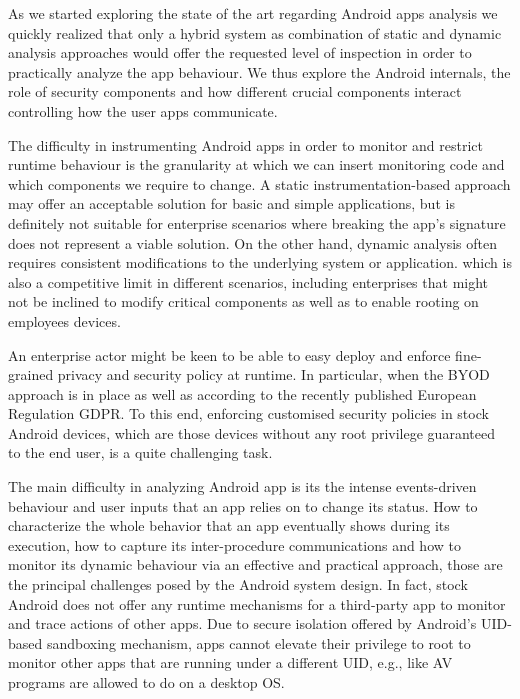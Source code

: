 As we started exploring the state of the art regarding Android apps  analysis we quickly realized that only a hybrid system as combination of static and dynamic analysis approaches would  offer the requested level of inspection in order to practically analyze the app behaviour.  We thus explore the Android internals, the role of security components and how different crucial components interact controlling how the user apps communicate.

The difficulty in instrumenting Android apps in order to monitor and restrict runtime behaviour is the granularity at which we can insert monitoring code and which components we require to change. A static instrumentation-based approach may offer an acceptable solution for basic and simple applications, but is definitely not suitable for enterprise scenarios where breaking the app's signature does not represent a viable solution. On the other hand, dynamic analysis often requires consistent modifications to the underlying system or application. which is also a competitive limit in different scenarios, including enterprises that might not be inclined to modify critical components as well as to enable rooting on employees devices.

An enterprise actor might be keen to be able to easy deploy and enforce fine-grained privacy and security policy at runtime. In particular, when the BYOD approach is in place as well as according to the recently published European Regulation GDPR. To this end, enforcing customised security policies in stock Android devices, which are those devices without any root privilege guaranteed to the end user, is a quite challenging task. 

The main difficulty in analyzing Android app is its the intense events-driven behaviour and user inputs that an app relies on to change its status. How to characterize the whole behavior that an app eventually shows during its execution, how to capture its inter-procedure communications and how to monitor its dynamic behaviour via an effective and practical approach, those are the principal challenges posed by the Android system design. In fact, stock Android does not offer any runtime mechanisms for a third-party app to monitor and trace actions of other apps. Due to secure isolation offered by Android’s UID-based sandboxing mechanism, apps cannot elevate their privilege to root to monitor other apps that are running under a different UID, e.g., like AV programs are allowed to do on a desktop OS. 

